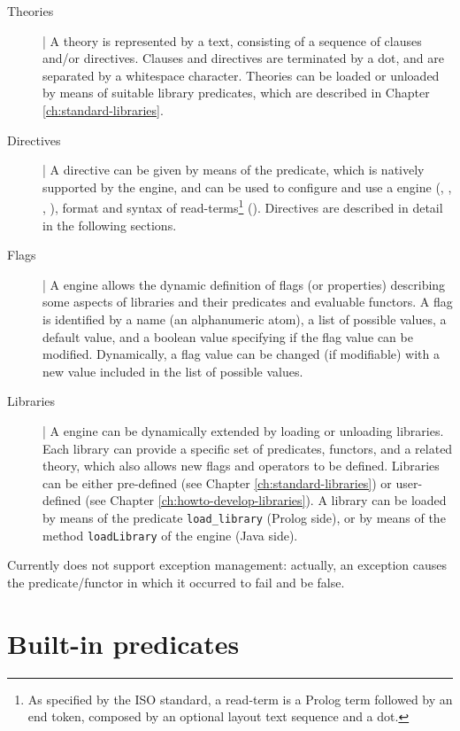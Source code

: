 \begin{description}
%
\item[Theories] |
A \tuprolog{} theory is represented by a text, consisting of a sequence of clauses and/or directives.
%
Clauses and directives are terminated by a dot, and are separated by a whitespace character.
%
Theories can be loaded or unloaded by means of suitable library predicates, which are described in Chapter \ref{ch:standard-libraries}.
%
\item[Directives] |
A directive can be given by means of the  predicate, which is natively supported by the engine, and can be used to configure and use a \tuprolog{} engine (, , , ), format and syntax of read-terms\footnote{As specified by the ISO standard, a read-term is a Prolog term followed by an end token, composed by an optional layout text sequence and a dot.} ().
%
Directives are described in detail in the following sections.
%
\item[Flags] |
A \tuprolog{} engine allows the dynamic definition of flags (or properties) describing some aspects of libraries and their predicates and evaluable functors.
%
A flag is identified by a name (an alphanumeric atom), a list of possible values, a default value, and a boolean value specifying if the flag value can be modified.
%
Dynamically, a flag value can be changed (if modifiable) with a new value included in the list of possible values.
%
\item[Libraries] |
A \tuprolog{} engine can be dynamically extended by loading or unloading libraries.
%
Each library can provide a specific set of predicates, functors, and a related theory, which also allows new flags and operators to be defined.
%
Libraries can be either pre-defined (see Chapter \ref{ch:standard-libraries}) or user-defined (see Chapter \ref{ch:howto-develop-libraries}).
%
A library can be loaded by means of the predicate \texttt{load\_library} (Prolog side), or by means of the method \texttt{loadLibrary} of the \tuprolog{} engine (Java side).
\end{description}
%
Currently \tuprolog{} does not support exception management: actually, an exception causes the predicate/functor in which it occurred to fail and be false.
%

\section{Built-in predicates}

